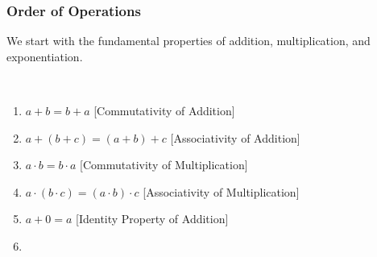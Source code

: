 \documentclass[crop=false,class=book,oneside]{standalone}
\begin{document}
        \subsubsection{Order of Operations}
            We start with the fundamental properties of
            addition, multiplication, and exponentiation.
            \begin{properties}
                \label{property:North_Shore_Arithmetic_Properties}
                \
                \begin{enumerate}
                    \item
                        \label{%
                            property:%
                            North_Shore_Arithmetic_Properties_%
                            Com_Add%
                        }
                        $a+b=b+a$\hfill
                        [Commutativity of Addition]
                    \item
                        \label{
                            property:%
                            north_shore_arithmetic_properties_%
                            assoc_add%
                        }
                        $a+(b+c)=(a+b)+c$\hfill
                        [Associativity of Addition]
                    \item
                        \label{%
                            property:%
                            north_shore_arithmetic_properties_%
                            comm_mult%
                        }
                        ${a}\cdot{b}={b}\cdot{a}$\hfill
                        [Commutativity of Multiplication]
                    \item
                        \label{%
                            property:%
                            north_shore_arithmetic_properties_%
                            assoc_mult%
                        }
                        ${a}\cdot{({b}\cdot{c})}%
                         ={({a}\cdot{b})}\cdot{c}$\hfill
                        [Associativity of Multiplication]
                    \item
                        \label{%
                            property:%
                            north_shore_arithmetic_properties_%
                            add_identity
                        }
                        $a+0=a$\hfill%
                        [Identity Property of Addition]
                    \item
                        \label{%
                            property:%
}
\end{enumerate}
\end{properties}
\end{document}
